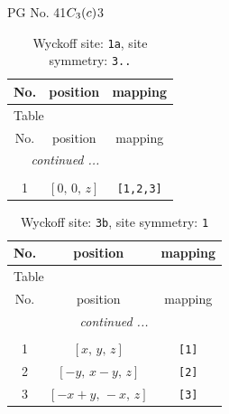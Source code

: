 \documentclass[fleqn,8pt]{jsarticle}
\begin{document}
\setcounter{MaxMatrixCols}{32}

\renewcommand{\tablename}{Table~}
\renewcommand{\figurename}{Figure~}
\begin{center}
\LARGE
PG No. 41\quad$C_{\rm 3}(c)$\quad$3$\quad[ trigonal ]
\end{center}
\renewcommand{\arraystretch}{1.2}
\begin{longtable}{ccc}
\caption{Wyckoff site: {\tt 1a}, site symmetry: {\tt 3..}}
 \\
 \hline \hline
No. & position & mapping \\ \hline \endfirsthead

\multicolumn{2}{l}{\tablename\ \thetable{}} \\
 \hline \hline
No. & position & mapping \\ \hline \endhead

 \hline \hline
\multicolumn{2}{r}{\footnotesize\it continued ...} \\ \endfoot

 \hline \hline
\multicolumn{2}{r}{} \\ \endlastfoot

1 & $\left[ 0,\, 0,\, z \right]$ & {\tt [1,2,3]} \\
\end{longtable}
\renewcommand{\arraystretch}{1.2}
\begin{longtable}{ccc}
\caption{Wyckoff site: {\tt 3b}, site symmetry: {\tt 1}}
 \\
 \hline \hline
No. & position & mapping \\ \hline \endfirsthead

\multicolumn{2}{l}{\tablename\ \thetable{}} \\
 \hline \hline
No. & position & mapping \\ \hline \endhead

 \hline \hline
\multicolumn{2}{r}{\footnotesize\it continued ...} \\ \endfoot

 \hline \hline
\multicolumn{2}{r}{} \\ \endlastfoot

1 & $\left[ x,\, y,\, z \right]$ & {\tt [1]} \\ \hline
2 & $\left[ - y,\, x - y,\, z \right]$ & {\tt [2]} \\ \hline
3 & $\left[ - x + y,\, - x,\, z \right]$ & {\tt [3]} \\
\end{longtable}
\end{document}
